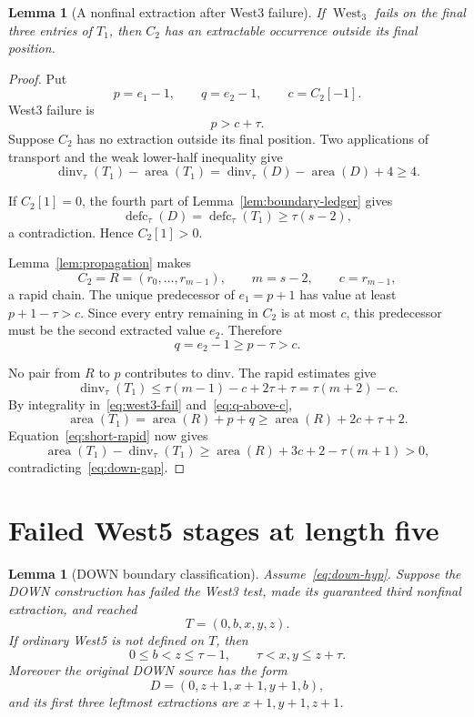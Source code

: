 \documentclass[11pt]{article}
\newtheorem{lemma}[theorem]{Lemma}
\theoremstyle{definition}
\theoremstyle{remark}
\newcommand{\area}{\operatorname{area}}
\newcommand{\dinv}{\operatorname{dinv}}
\newcommand{\defc}{\operatorname{defc}}
\newcommand{\West}{\operatorname{West}}
\begin{document}
\begin{lemma}[A nonfinal extraction after West3 failure]
\label{lem:down-third-position}
If $\West_3$ fails on the final three entries of $T_1$, then $C_2$ has an
extractable occurrence outside its final position.
\end{lemma}

\begin{proof}
Put
\[
  p=e_1-1,
  \qquad q=e_2-1,
  \qquad c=C_2[-1].
\]
West3 failure is
\begin{equation}
  p>c+\tau.
  \label{eq:west3-fail}
\end{equation}
Suppose $C_2$ has no extraction outside its final position.  Two applications
of transport and the weak lower-half inequality give
\begin{equation}
  \dinv_\tau(T_1)-\area(T_1)
  =\dinv_\tau(D)-\area(D)+4\ge4.
  \label{eq:down-gap}
\end{equation}

If $C_2[1]=0$, the fourth part of Lemma~\ref{lem:boundary-ledger} gives
\[
  \defc_\tau(D)=\defc_\tau(T_1)\ge\tau(s-2),
\]
a contradiction.  Hence $C_2[1]>0$.

Lemma~\ref{lem:propagation} makes
\[
  C_2=R=(r_0,\ldots,r_{m-1}),
  \qquad m=s-2,
  \qquad c=r_{m-1},
\]
a rapid chain.  The unique predecessor of $e_1=p+1$ has value at least
$p+1-\tau>c$.  Since every entry remaining in $C_2$ is at most $c$, this
predecessor must be the second extracted value $e_2$.  Therefore
\begin{equation}
  q=e_2-1\ge p-\tau>c.
  \label{eq:q-above-c}
\end{equation}

No pair from $R$ to $p$ contributes to dinv.  The rapid estimates give
\[
 \dinv_\tau(T_1)
 \le\tau(m-1)-c+2\tau+\tau
 =\tau(m+2)-c.
\]
By integrality in~\eqref{eq:west3-fail} and~\eqref{eq:q-above-c},
\[
 \area(T_1)=\area(R)+p+q
 \ge\area(R)+2c+\tau+2.
\]
Equation~\eqref{eq:short-rapid} now gives
\[
 \area(T_1)-\dinv_\tau(T_1)
 \ge\area(R)+3c+2-\tau(m+1)>0,
\]
contradicting~\eqref{eq:down-gap}.
\end{proof}


\section{Failed West5 stages at length five}

\begin{lemma}[DOWN boundary classification]
\label{lem:down-boundary-classification}
Assume~\eqref{eq:down-hyp}.  Suppose the DOWN construction has failed the
West3 test, made its guaranteed third nonfinal extraction, and reached
\[
 T=(0,b,x,y,z).
\]
If ordinary West5 is not defined on $T$, then
\begin{equation}
 0\le b<z\le\tau-1,
 \qquad
 \tau<x,y\le z+\tau.
 \label{eq:down-boundary-bounds}
\end{equation}
Moreover the original DOWN source has the form
\begin{equation}
 D=(0,z+1,x+1,y+1,b),
 \label{eq:down-source-shape}
\end{equation}
and its first three leftmost extractions are
$x+1,y+1,z+1$.
\end{lemma}
\end{document}
